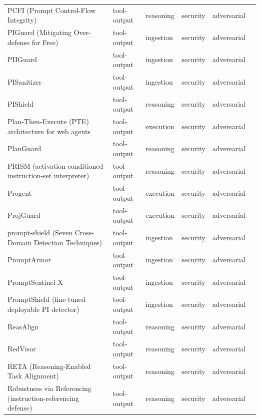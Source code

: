 \begin{longtable}{@{}p{}lllll@{}}
PCFI (Prompt Control-Flow Integrity) & tool-output & reasoning & security & adversarial & \cite{alam-2026-prompt} \\
PIGuard (Mitigating Over-defense for Free) & tool-output & ingestion & security & adversarial & \cite{li-2025-piguard} \\
PIIGuard & tool-output & ingestion & security & adversarial & \cite{liu-2026-piiguard} \\
PISanitizer & tool-output & ingestion & security & adversarial & \cite{geng-2025-pisanitizer} \\
PIShield & tool-output & reasoning & security & adversarial & \cite{zou-2025-pishield} \\
Plan-Then-Execute (PTE) architecture for web agents & tool-output & execution & security & adversarial & \cite{piet-2026-web} \\
PlanGuard & tool-output & reasoning & security & adversarial & \cite{gong-2026-planguard} \\
PRISM (activation-conditioned instruction-set interpreter) & tool-output & reasoning & security & adversarial & \cite{gressel-2026-prism} \\
Progent & tool-output & execution & security & adversarial & \cite{shi-2025-progent} \\
ProjGuard & tool-output & execution & security & adversarial & \cite{contreras-2026-projguard} \\
prompt-shield (Seven Cross-Domain Detection Techniques) & tool-output & ingestion & security & adversarial & \cite{munirathinam-2026-pattern} \\
PromptArmor & tool-output & ingestion & security & adversarial & \cite{shi-2025-promptarmor} \\
PromptSentinel-X & tool-output & ingestion & security & adversarial & \cite{zhuhadar-2026-promptsentinelx} \\
PromptShield (fine-tuned deployable PI detector) & tool-output & ingestion & security & adversarial & \cite{jacob-2024-promptshield} \\
ReasAlign & tool-output & reasoning & security & adversarial & \cite{li-2026-reasalign} \\
RedVisor & tool-output & reasoning & security & adversarial & \cite{liu-2026-redvisor} \\
RETA (Reasoning-Enabled Task Alignment) & tool-output & reasoning & security & adversarial & \cite{he-2026-defending} \\
Robustness via Referencing (instruction-referencing defense) & tool-output & reasoning & security & adversarial & \cite{chen-2025-robustness} \\

\end{longtable}
